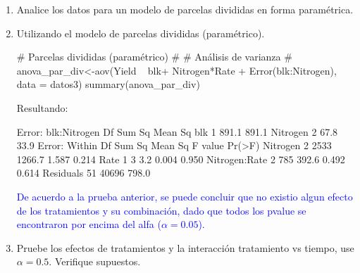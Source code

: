 \documentclass[a4paper,12pt]{article}
\begin{document}
\begin{enumerate}[label=\textbf{\alph*})]
\item Analice los datos para un modelo de parcelas divididas en forma paramétrica.
\item Utilizando el modelo de parcelas divididas (paramétrico).
	\begin{MyVerbatim}
# Parcelas divididas (paramétrico) #
# Análisis de varianza #
anova_par_div<-aov(Yield ~ blk+ Nitrogen*Rate + 
Error(blk:Nitrogen), data = datos3)
summary(anova_par_div)
	\end{MyVerbatim}
Resultando:
	\begin{MyVerbatim}
Error: blk:Nitrogen
         Df Sum Sq Mean Sq
blk       1  891.1   891.1
Nitrogen  2   67.8    33.9
Error: Within
	      Df Sum Sq Mean Sq F value Pr(>F)
Nitrogen       2   2533  1266.7   1.587    0.214
Rate           1      3     3.2   0.004    0.950
Nitrogen:Rate  2    785   392.6   0.492    0.614
Residuals     51  40696   798.0
	\end{MyVerbatim}
\textcolor{blue}{De acuerdo a la prueba anterior, se puede concluir que no existio algun efecto de los tratamientos y su combinación, dado que todos los pvalue se encontraron por encima del alfa (\(\alpha=0.05\)).}

\item Pruebe los efectos de tratamientos y la interacción tratamiento vs tiempo, use \(\alpha=0.5\). Verifique supuestos.


\end{enumerate}
\end{document}
